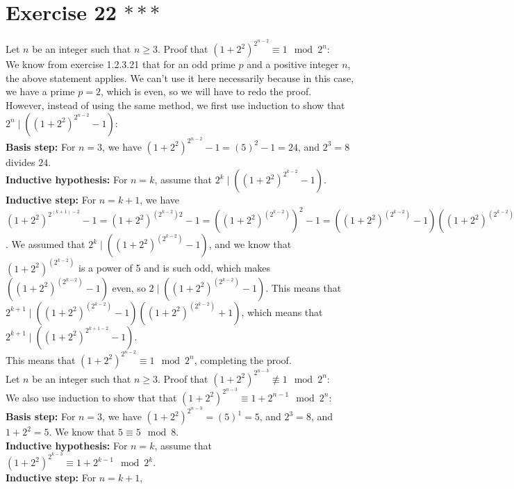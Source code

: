 \documentclass{article}
\begin{document}
    \section*{Exercise 22 $***$}
    Let $n$ be an integer such that $n \geqslant 3$.
    Proof that $(1 + 2^2)^{2^{n-2}} \equiv 1 \mod 2^n$: \\ 
    We know from exercise 1.2.3.21 that for
    an odd prime $p$ and a positive integer $n$,
    the above statement applies.
    We can't use it here necessarily because in this case,
    we have a prime $p = 2$, which is even,
    so we will have to redo the proof. \\
    However, instead of using the same method,
    we first use induction to show
    that $2^n \mid ((1 + 2^2)^{2^{n-2}} - 1)$: \\
    \textbf{Basis step:} For $n = 3$,
    we have $(1 + 2^2)^{2^{n-2}} - 1 = (5)^2 - 1 = 24$,
    and $2^3 = 8$ divides $24$. \\
    \textbf{Inductive hypothesis:} For $n = k$,
    assume that $2^k \mid ((1 + 2^2)^{2^{k-2}} - 1)$. \\
    \textbf{Inductive step:} For $n = k + 1$,
    we have $(1 + 2^2)^{2^{(k+1)-2}} - 1 = (1 + 2^2)^{(2^{k-2})2} - 1
    =  ((1 + 2^2)^{(2^{k-2})})^2 - 1
    = ((1 + 2^2)^{(2^{k-2})} - 1)((1 + 2^2)^{(2^{k-2})} + 1)$.
    We assumed that $2^k \mid ((1 + 2^2)^{(2^{k-2})} - 1)$,
    and we know that $(1 + 2^2)^{(2^{k-2})}$ is a power of 5
    and is such odd, which makes $((1 + 2^2)^{(2^{k-2})} - 1)$ even,
    so $2 \mid ((1 + 2^2)^{(2^{k-2})} - 1)$.
    This means that
    $2^{k+1} \mid ((1 + 2^2)^{(2^{k-2})} - 1)((1 + 2^2)^{(2^{k-2})} + 1)$,
    which means that $2^{k+1} \mid ((1 + 2^2)^{2^{k + 1 - 2}} - 1)$. \\
    This means that $(1 + 2^2)^{2^{n-2}} \equiv 1 \mod 2^n$,
    completing the proof. \\
    Let $n$ be an integer such that $n \geqslant 3$.
    Proof that $(1 + 2^2)^{2^{n-3}} \not\equiv 1 \mod 2^n$: \\ 
    We also use induction to show that 
    that $(1 + 2^2)^{2^{n-3}} \equiv 1 + 2^{n-1} \mod 2^n$: \\
    \textbf{Basis step:} For $n = 3$,
    we have $(1 + 2^2)^{2^{n-3}} = (5)^1 = 5$,
    and $2^3 = 8$, and $1 + 2^2 = 5$.
    We know that $5 \equiv 5 \mod 8$. \\
    \textbf{Inductive hypothesis:} For $n = k$,
    assume that $(1 + 2^2)^{2^{k-3}} \equiv 1 + 2^{k-1} \mod 2^k$. \\
    \textbf{Inductive step:} For $n = k + 1$,
\end{document}
